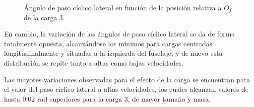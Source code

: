 \begin{figure}
	\centering
	\caption{Ángulo de paso cíclico lateral en función de la posición relativa a $O_f$ de la carga 3.}
	\label{theta1SVH3lxy}
\end{figure}

En cambio, la variación de los ángulos de paso cíclico lateral se da de forma totalmente opuesta, alcanzándose los mínimos para cargas centradas longitudinalmente y situadas a la izquierda del fuselaje, y de nuevo esta distribución se repite tanto a altas como bajas velocidades.

Las mayores variaciones observadas para el efecto de la carga se encuentran para el valor del paso cíclico lateral a altas velocidades, los cuales alcanzan valores de hasta 0.02 rad superiores para la carga 3, de mayor tamaño y masa.

